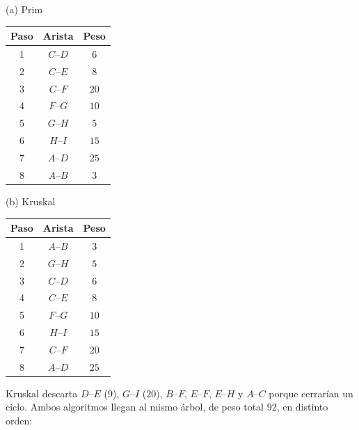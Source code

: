 \ejercicio{}

\begin{minipage}[t]{0.48\textwidth}
  \centering (a) Prim
  \begin{center}
    \begin{tabular}{|c|c|c|}
      \hline
      Paso & Arista & Peso \\ \hline
      1 & $C$--$D$ & $6$ \\ \hline
      2 & $C$--$E$ & $8$ \\ \hline
      3 & $C$--$F$ & $20$ \\ \hline
      4 & $F$--$G$ & $10$ \\ \hline
      5 & $G$--$H$ & $5$ \\ \hline
      6 & $H$--$I$ & $15$ \\ \hline
      7 & $A$--$D$ & $25$ \\ \hline
      8 & $A$--$B$ & $3$ \\ \hline
    \end{tabular}
  \end{center}
\end{minipage}%
\hfill
\begin{minipage}[t]{0.48\textwidth}
  \centering (b) Kruskal
  \begin{center}
    \begin{tabular}{|c|c|c|}
      \hline
      Paso & Arista & Peso \\ \hline
      1 & $A$--$B$ & $3$ \\ \hline
      2 & $G$--$H$ & $5$ \\ \hline
      3 & $C$--$D$ & $6$ \\ \hline
      4 & $C$--$E$ & $8$ \\ \hline
      5 & $F$--$G$ & $10$ \\ \hline
      6 & $H$--$I$ & $15$ \\ \hline
      7 & $C$--$F$ & $20$ \\ \hline
      8 & $A$--$D$ & $25$ \\ \hline
    \end{tabular}
  \end{center}
\end{minipage}

Kruskal descarta $D$--$E$ ($9$), $G$--$I$ ($20$), $B$--$F$, $E$--$F$, $E$--$H$ y $A$--$C$ porque cerrarían un ciclo. Ambos algoritmos llegan al mismo árbol, de peso total $92$, en distinto orden:

\begin{center}
\end{center}
